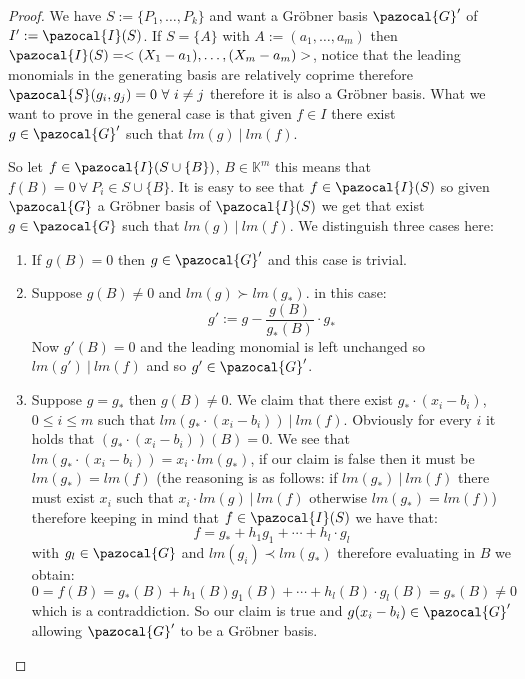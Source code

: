 \documentclass[11pt,a4paper]{report}
\theoremstyle{plain}
\theoremstyle{definition}
\newcommand{\I}{\pazocal{I}}
\newcommand{\G}{\pazocal{G}}
\newcommand{\Sp}{\pazocal{S}}
\begin{document}
\begin{thm-hand}[3.2.1]
\end{thm-hand}
\begin{proof}
	We have $S := \{P_1, \ldots, P_k\}$ and want a Gr\"obner basis $\G'$ of $I' := \I(S)$. 
	If $S = \{A\}$ with $A := (a_1,\ldots ,a_m)$ then $\I(S) = <(X_1 - a_1), \ldots, (X_m -a_m)>$, notice that the leading monomials in the generating basis are relatively coprime therefore $\Sp(g_i,g_j) = 0\ \forall\ i\ne j$ therefore it is also a Gr\"obner basis.
	What we want to prove in the general case is that given $f \in I$ there exist $g \in \G'$ such that $lm(g)\ |\ lm(f)$.
	
	So let $f \in \I(S \cup \{B\})$, $B \in \mathbb{K}^m$ this means that $f(B) = 0\ \forall\ P_i \in S\cup \{B\}$. It is easy to see that $f \in \I(S)$ so given $\G$ a Gr\"obner basis of $\I(S)$ we get that exist $g \in \G$ such that $lm(g)\ |\ lm(f)$. We distinguish three cases here:
	\begin{enumerate}
		\item If $g(B) = 0$ then $g \in \G'$ and this case is trivial.
		\item Suppose $g(B) \ne 0$ and $lm(g)\succ lm(g_*)$. in this case:
			\[
				g' := g - \frac{g(B)}{g_*(B)}\cdot g_*			
			\]
			Now $g'(B) = 0$ and the leading monomial is left unchanged so $lm(g')\ |\ lm(f)$ and so $g' \in \G'$.
		\item Suppose $g = g_*$ then $g(B) \ne 0$. We claim that there exist $g_*\cdot (x_i - b_i)$, $0\le i \le m$ such that $lm(g_*\cdot (x_i - b_i))\ |\ lm(f)$. Obviously for every $i$ it holds that $(g_*\cdot (x_i - b_i))(B) = 0$. We see that $lm(g_*\cdot (x_i - b_i)) = x_i\cdot lm(g_*)$, if our claim is false then it must be $lm(g_*) = lm(f)$ (the reasoning is as follows: if $lm(g_*)\ |\ lm(f)$ there must exist $x_i$ such that $x_i\cdot lm(g)\ |\ lm(f)$ otherwise $lm(g_*)= lm(f)$) therefore keeping in mind that $f \in \I(S)$ we have that:
		\[
			f = g_* + h_1g_1 + \cdots + 	h_l\cdot g_l
		\]
		with $g_l \in \G$ and $lm(g_i) \prec lm(g_*)$ therefore evaluating in $B$ we obtain:
		\[
			0 = f(B) = g_*(B) + h_1(B)g_1(B) + \cdots + 	h_l(B)\cdot g_l(B) = g_*(B) \ne 0
		\]
		which is a contraddiction. So our claim is true and $g(x_i - b_i) \in \G'$ allowing $\G'$ to be a Gr\"obner basis.
	\end{enumerate}
\end{proof}

\begin{prop-hand}[3.4.2]
\end{prop-hand}
\end{document}
